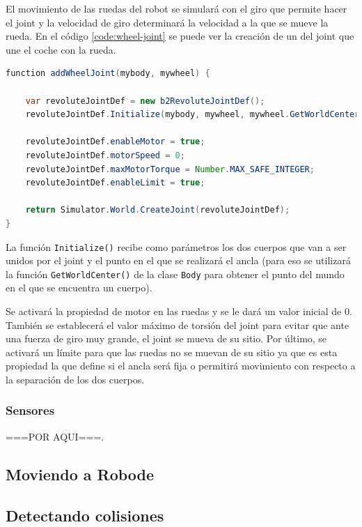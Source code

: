 {El movimiento de las ruedas del robot se simulará con el giro que permite hacer el joint y la velocidad de giro determinará la velocidad a la que se mueve la rueda. En el código \ref{code:wheel-joint} se puede ver la creación de un del joint que une el coche con la rueda.

\begin{lstlisting}[language={Java},label={code:wheel-joint}, caption={Función que crea el joint que une la rueda al coche.}]
function addWheelJoint(mybody, mywheel) {

	var revoluteJointDef = new b2RevoluteJointDef();
	revoluteJointDef.Initialize(mybody, mywheel, mywheel.GetWorldCenter());

	revoluteJointDef.enableMotor = true;
	revoluteJointDef.motorSpeed = 0;
	revoluteJointDef.maxMotorTorque = Number.MAX_SAFE_INTEGER;
	revoluteJointDef.enableLimit = true;

	return Simulator.World.CreateJoint(revoluteJointDef);
}
\end{lstlisting}

La función \texttt{Initialize()} recibe como parámetros los dos cuerpos que van a ser unidos por el joint y el punto en el que se realizará el ancla (para eso se utilizará la función \texttt{GetWorldCenter()} de la clase \texttt{Body} para obtener el punto del mundo en el que se encuentra un cuerpo).

Se activará la propiedad de motor en las ruedas y se le dará un valor inicial de 0. También se establecerá el valor máximo de torsión del joint para evitar que ante una fuerza de giro muy grande, el joint se mueva de su sitio. Por último, se activará un límite para que las ruedas no se muevan de su sitio ya que es esta propiedad la que define si el ancla será fija o permitirá movimiento con respecto a la separación de los dos cuerpos.


\subsubsection*{Sensores}
{\color{green} ===POR AQUI===}.


\subsection{Moviendo a Robode}
\label{moviendo-robode}



\subsection{Detectando colisiones}
\label{detectando-colisiones}



}
